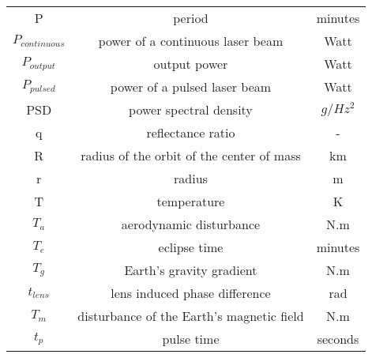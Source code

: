 \begin{center}
\begin{longtable}{c|c|c}
P                             			& period                                      														& minutes \\

$P_{continuous}$ 										& power of a continuous laser beam																				& Watt \\

$P_{output}$                       	& output power                             																& Watt \\

$P_{pulsed}$ 												& power of a pulsed laser beam																						& Watt \\

PSD                             		& power spectral density                       														& $g/{Hz^2}$ \\

q                               		& reflectance ratio                              													& - \\

R																		& radius of the orbit of the center of mass 															& km \\

r                                   & radius                                                                  & m \\

T 																	& temperature 																														& K \\

$T_a$                             	& aerodynamic disturbance                         												& N.m \\

$T_e$                              	& eclipse time                             																& minutes \\

$T_g$                         			& Earth's gravity gradient                        												& N.m \\

$t_{lens}$													& lens induced phase difference																						& rad \\

$T_m$                         			& disturbance of the Earth's magnetic field     													& N.m \\

$t_p$                          			& pulse time                         																			& seconds \\


\end{longtable}
\end{center}
